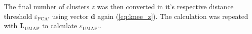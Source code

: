 




The final number of clusters $z$ was then converted in it's respective distance threshold $\varepsilon_{\text{PCA'}}$ using vector $\mathbf{d}$ again (\autoref{eq:knee_z}). The calculation was repeated with $\mathbf{L}_{\text{UMAP}}$ to calculate $\varepsilon_{\text{UMAP'}}$.



        
